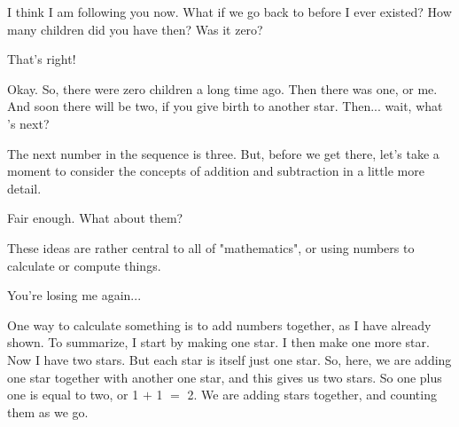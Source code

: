 \documentclass[main.tex]{subfiles}
\begin{document}
\par \Maia I think I am following you now.  What if we go back to before I ever existed?  How many children did you have then?  Was it zero?

\par \Pleione That's right!

\par \Maia Okay.  So, there were zero children a long time ago.  Then there was one, or me.  And soon there will be two, if you give birth to another star.  Then... wait, what 's next?

\par \Pleione The next number in the sequence is three.  But, before we get there, let's take a moment to consider the concepts of addition and subtraction in a little more detail.

\par \Maia Fair enough.  What about them?

\par \Pleione These ideas are rather central to all of "mathematics", or using numbers to calculate or compute things.



\par \Maia You're losing me again...

\par \Pleione One way to calculate something is to add numbers together, as I have already shown.  To summarize, I start by making one star.  I then make one more star.  Now I have two stars.  But each star is itself just one star.  So, here, we are adding one star together with another one star, and this gives us two stars.  So one plus one is equal to two, or 1 $+$ 1 $=$ 2.  We are adding stars together, and counting them as we go.
\end{document}
